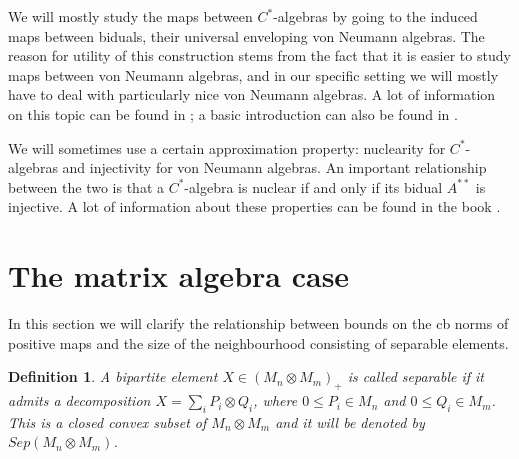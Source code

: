 \documentclass[11pt]{article}
\numberwithin{theorem}{section}
\newtheorem{definition}[theorem]{Definition}
\begin{document}
We will mostly study the maps between $C^{\ast}$-algebras by going to the induced maps between biduals, their universal enveloping von Neumann algebras. The reason for utility of this construction stems from the fact that it is easier to study maps between von Neumann algebras, and in our specific setting we will mostly have to deal with particularly nice von Neumann algebras. A lot of information on this topic can be found in \cite[Chapter III.2]{Takesaki}; a basic introduction can also be found in \cite[Chapter 1.4]{BrownOzawa}.

We will sometimes use a certain approximation property: nuclearity for $C^{\ast}$-algebras and injectivity for von Neumann algebras. An important relationship between the two is that a $C^{\ast}$-algebra is nuclear if and only if its bidual $A^{\ast\ast}$ is injective. A lot of information about these properties can be found in the book \cite{BrownOzawa}.

\section{The matrix algebra case}\label{sec:matrix}
In this section we will clarify the relationship between bounds on the cb norms of positive maps and the size of the neighbourhood consisting of separable elements. 
\begin{definition}
A bipartite element $X\in (M_n\otimes M_m)_{+}$ is called \emph{separable} if it admits a decomposition $X=\sum_i P_i\otimes Q_i$, where $0 \leq P_i \in M_n$ and $0 \leq Q_i\in M_m$. This is a closed convex subset of $M_{n} \otimes M_m$ and it will be denoted by $Sep(M_n\otimes M_{m})$.
\end{definition}
\end{document}
